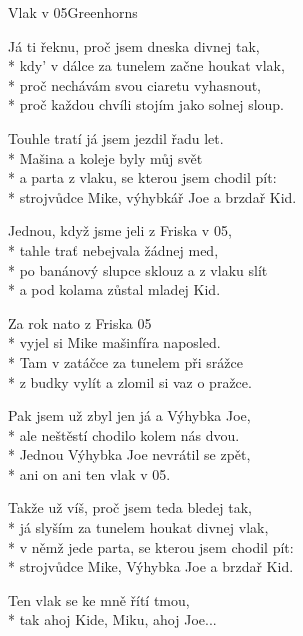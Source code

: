 \documentclass[10.5pt]{book}
\begin{document}
\begin{poem}{Vlak v 05}{Greenhorns}

\settowidth{\versewidth}{v němž jede parta, se kterou jsem chodil pít:}

Já ti řeknu, proč jsem dneska divnej tak,\\*
kdy' v dálce za tunelem začne houkat vlak,\\*
proč nechávám svou ciaretu vyhasnout,\\*
proč každou chvíli stojím jako solnej sloup.

Touhle tratí já jsem jezdil řadu let.\\*
Mašina a koleje byly můj svět\\*
a parta z vlaku, se kterou jsem chodil pít:\\*
strojvůdce Mike, výhybkář Joe a brzdař Kid.

Jednou, když jsme jeli z Friska v 05,\\*
tahle trať nebejvala žádnej med,\\*
po banánový slupce sklouz a z vlaku slít\\*
a pod kolama zůstal mladej Kid.

Za rok nato z Friska 05\\*
vyjel si Mike mašinfíra naposled.\\*
Tam v zatáčce za tunelem při srážce\\*
z budky vylít a zlomil si vaz o pražce.

Pak jsem už zbyl jen já a Výhybka Joe,\\*
ale neštěstí chodilo kolem nás dvou.\\*
Jednou Výhybka Joe nevrátil se zpět,\\*
ani on ani ten vlak v 05.

Takže už víš, proč jsem teda bledej tak,\\*
já slyším za tunelem houkat divnej vlak,\\*
v němž jede parta, se kterou jsem chodil pít:\\*
strojvůdce Mike, Výhybka Joe a brzdař Kid.

Ten vlak se ke mně řítí tmou,\\*
tak ahoj Kide, Miku, ahoj Joe...

\end{poem}
\end{document}
